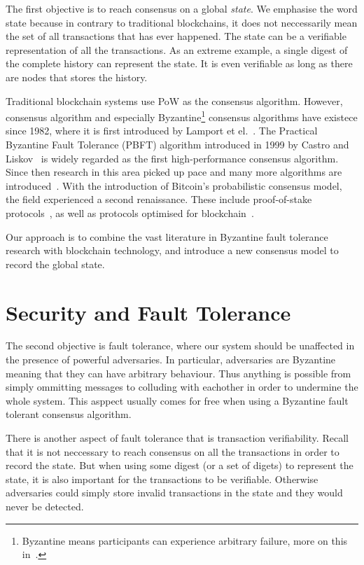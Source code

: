 The first objective is to reach consensus on a global \emph{state}.
We emphasise the word state because in contrary to traditional blockchains,
it does not neccessarily mean the set of all transactions that has ever happened.
The state can be a verifiable representation of all the transactions.
As an extreme example, a single digest of the complete history can represent the state.
It is even verifiable as long as there are nodes that stores the history.

Traditional blockchain systems use PoW as the consensus algorithm.
However, consensus algorithm and especially Byzantine\footnote{Byzantine means participants can experience arbitrary failure, more on this in~.}
consensus algorithms have existece since 1982,
where it is first introduced by Lamport et el.~\cite{lamport1982byzantine}.
The Practical Byzantine Fault Tolerance (PBFT) algorithm introduced in 1999 by Castro and Liskov~\cite{castro1999practical} is widely regarded as the first high-performance consensus algorithm.
Since then research in this area picked up pace and many more algorithms are introduced~\cite{abd2005fault, kotla2007zyzzyva}.
With the introduction of Bitcoin's probabilistic consensus model, the field experienced a second renaissance.
These include proof-of-stake protocols~\cite{bentov2016snow, micali2016algorand}, as well as protocols optimised for blockchain~\cite{liu2016xft, miller2016honey}.

Our approach is to combine the vast literature in Byzantine fault tolerance research with blockchain technology,
and introduce a new consensus model to record the global state.

\section{Security and Fault Tolerance}

The second objective is fault tolerance,
where our system should be unaffected in the presence of powerful adversaries.
In particular, adversaries are Byzantine meaning that they can have arbitrary behaviour.
Thus anything is possible from simply ommitting messages to colluding with eachother in order to undermine the whole system.
This asppect usually comes for free when using a Byzantine fault tolerant consensus algorithm.

There is another aspect of fault tolerance that is transaction verifiability.
Recall that it is not neccessary to reach consensus on all the transactions in order to record the state.
But when using some digest (or a set of digets) to represent the state, it is also important for the transactions to be verifiable.
Otherwise adversaries could simply store invalid transactions in the state and they would never be detected.

